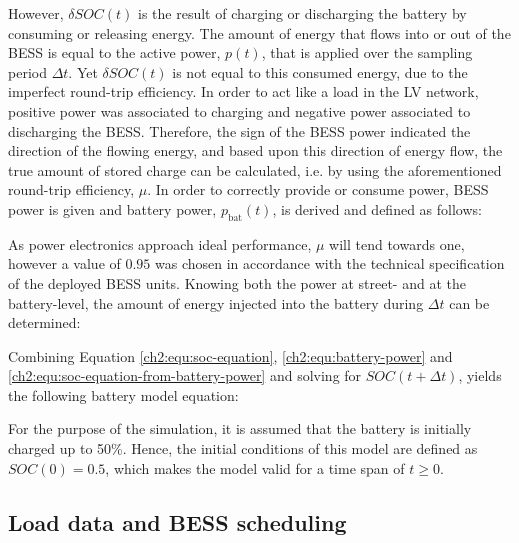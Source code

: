 

However, $\delta SOC(t)$ is the result of charging or discharging the battery by consuming or releasing energy.
The amount of energy that flows into or out of the BESS is equal to the active power, $p(t)$, that is applied over the sampling period $\Delta t$.
Yet $\delta SOC(t)$ is not equal to this consumed energy, due to the imperfect round-trip efficiency.
In order to act like a load in the LV network, positive power was associated to charging and negative power associated to discharging the BESS.
Therefore, the sign of the BESS power indicated the direction of the flowing energy, and based upon this direction of energy flow, the true amount of stored charge can be calculated, i.e. by using the aforementioned round-trip efficiency, $\mu$.
In order to correctly provide or consume power, BESS power is given and battery power, $p_\text{bat}(t)$, is derived and defined as follows:



As power electronics approach ideal performance, $\mu$ will tend towards one, however a value of $0.95$ was chosen in accordance with the technical specification of the deployed BESS units.
Knowing both the power at street- and at the battery-level, the amount of energy injected into the battery during $\Delta t$ can be determined:



Combining Equation \ref{ch2:equ:soc-equation}, \ref{ch2:equ:battery-power} and \ref{ch2:equ:soc-equation-from-battery-power} and solving for $SOC(t+\Delta t)$, yields the following battery model equation:



For the purpose of the simulation, it is assumed that the battery is initially charged up to 50\%.
Hence, the initial conditions of this model are defined as $SOC(0) = 0.5$, which makes the model valid for a time span of $t \geq 0$.

\subsection{Load data and BESS scheduling}


